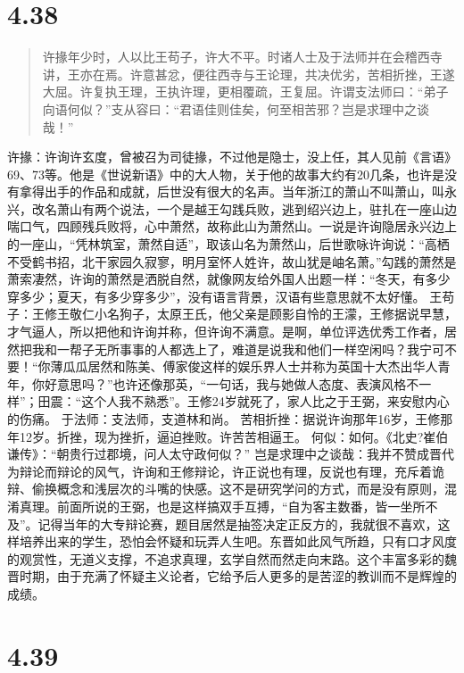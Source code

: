 \documentclass[]{book}
\begin{document}
\section{4.38}\label{section-216}

\begin{quote}
许掾年少时，人以比王苟子，许大不平。时诸人士及于法师并在会稽西寺讲，王亦在焉。许意甚忿，便往西寺与王论理，共决优劣，苦相折挫，王遂大屈。许复执王理，王执许理，更相覆疏，王复屈。许谓支法师曰：``弟子向语何似？''支从容曰：``君语佳则佳矣，何至相苦邪？岂是求理中之谈哉！''
\end{quote}

许掾：许询许玄度，曾被召为司徒掾，不过他是隐士，没上任，其人见前《言语》69、73等。他是《世说新语》中的大人物，关于他的故事大约有20几条，也许是没有拿得出手的作品和成就，后世没有很大的名声。当年浙江的萧山不叫萧山，叫永兴，改名萧山有两个说法，一个是越王勾践兵败，逃到绍兴边上，驻扎在一座山边喘口气，四顾残兵败将，心中萧然，故称此山为萧然山。一说是许询隐居永兴边上的一座山，``凭林筑室，萧然自适''，取该山名为萧然山，后世歌咏许询说：``高栖不受鹤书招，北干家园久寂寥，明月室怀人姓许，故山犹是岫名萧。''勾践的萧然是萧索凄然，许询的萧然是洒脱自然，就像网友给外国人出题一样：``冬天，有多少穿多少；夏天，有多少穿多少''，没有语言背景，汉语有些意思就不太好懂。
王苟子：王修王敬仁小名狗子，太原王氏，他父亲是顾影自怜的王濛，王修据说早慧，才气逼人，所以把他和许询并称，但许询不满意。是啊，单位评选优秀工作者，居然把我和一帮子无所事事的人都选上了，难道是说我和他们一样空闲吗？我宁可不要！``你薄瓜瓜居然和陈美、傅家俊这样的娱乐界人士并称为英国十大杰出华人青年，你好意思吗？''也许还像那英，``一句话，我与她做人态度、表演风格不一样''；田震：``这个人我不熟悉''。王修24岁就死了，家人比之于王弼，来安慰内心的伤痛。
于法师：支法师，支道林和尚。
苦相折挫：据说许询那年16岁，王修那年12岁。折挫，现为挫折，逼迫挫败。许苦苦相逼王。
何似：如何。《北史?崔伯谦传》：``朝贵行过郡境，问人太守政何似？''
岂是求理中之谈哉：我并不赞成晋代为辩论而辩论的风气，许询和王修辩论，许正说也有理，反说也有理，充斥着诡辩、偷换概念和浅层次的斗嘴的快感。这不是研究学问的方式，而是没有原则，混淆真理。前面所说的王弼，也是这样搞双手互搏，``自为客主数番，皆一坐所不及''。记得当年的大专辩论赛，题目居然是抽签决定正反方的，我就很不喜欢，这样培养出来的学生，恐怕会怀疑和玩弄人生吧。东晋如此风气所趋，只有口才风度的观赏性，无道义支撑，不追求真理，玄学自然而然走向末路。这个丰富多彩的魏晋时期，由于充满了怀疑主义论者，它给予后人更多的是苦涩的教训而不是辉煌的成绩。

\section{4.39}\label{section-217}
\end{document}
